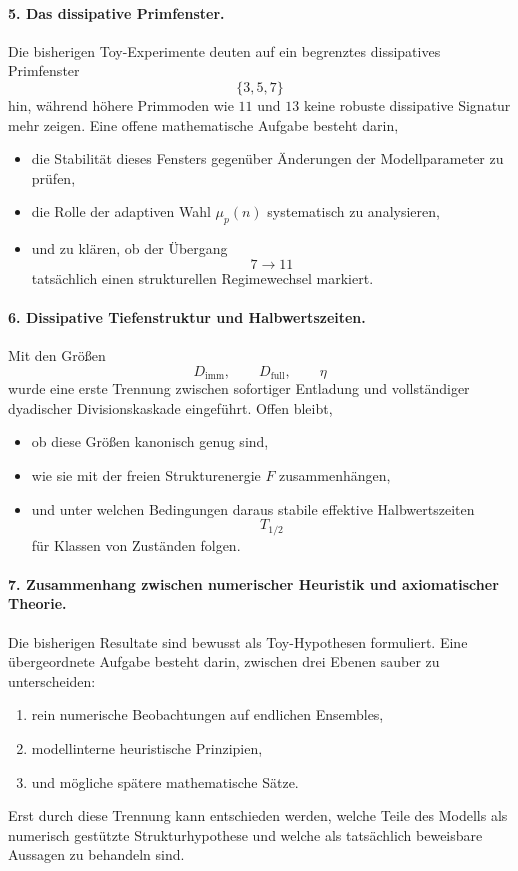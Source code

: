\documentclass[11pt,a4paper]{article}
\theoremstyle{definition}
\begin{document}
\paragraph{5. Das dissipative Primfenster.}
Die bisherigen Toy-Experimente deuten auf ein begrenztes dissipatives Primfenster
\[
\{3,5,7\}
\]
hin, während höhere Primmoden wie \(11\) und \(13\) keine robuste dissipative Signatur mehr zeigen. Eine offene mathematische Aufgabe besteht darin,
\begin{itemize}
	\item die Stabilität dieses Fensters gegenüber Änderungen der Modellparameter zu prüfen,
	\item die Rolle der adaptiven Wahl \(\mu_p(n)\) systematisch zu analysieren,
	\item und zu klären, ob der Übergang
	\[
	7\longrightarrow 11
	\]
	tatsächlich einen strukturellen Regimewechsel markiert.
\end{itemize}

\paragraph{6. Dissipative Tiefenstruktur und Halbwertszeiten.}
Mit den Größen
\[
D_{\mathrm{imm}},\qquad D_{\mathrm{full}},\qquad \eta
\]
wurde eine erste Trennung zwischen sofortiger Entladung und vollständiger dyadischer Divisionskaskade eingeführt. Offen bleibt,
\begin{itemize}
	\item ob diese Größen kanonisch genug sind,
	\item wie sie mit der freien Strukturenergie \(F\) zusammenhängen,
	\item und unter welchen Bedingungen daraus stabile effektive Halbwertszeiten
	\[
	T_{1/2}
	\]
	für Klassen von Zuständen folgen.
\end{itemize}

\paragraph{7. Zusammenhang zwischen numerischer Heuristik und axiomatischer Theorie.}
Die bisherigen Resultate sind bewusst als Toy-Hypothesen formuliert. Eine übergeordnete Aufgabe besteht darin, zwischen drei Ebenen sauber zu unterscheiden:
\begin{enumerate}
	\item rein numerische Beobachtungen auf endlichen Ensembles,
	\item modellinterne heuristische Prinzipien,
	\item und mögliche spätere mathematische Sätze.
\end{enumerate}
Erst durch diese Trennung kann entschieden werden, welche Teile des Modells als numerisch gestützte Strukturhypothese und welche als tatsächlich beweisbare Aussagen zu behandeln sind.
\end{document}
